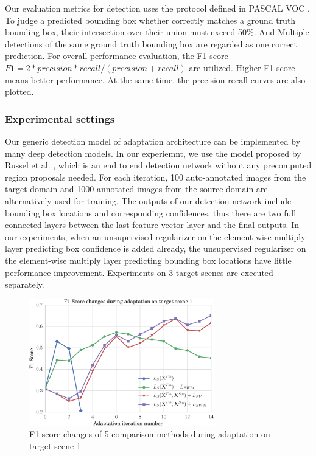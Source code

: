 \documentclass[runningheads]{llncs}
\begin{document}
Our evaluation metrics for detection uses the protocol defined in PASCAL VOC \cite{everingham2015pascal}. To judge a predicted bounding box whether correctly matches a ground truth bounding box, their intersection over their union must exceed 50\%. And Multiple detections of the same ground truth bounding box are regarded as one correct prediction. For overall performance evaluation, the F1 score $F1 = 2*precision*recall/(precision+recall)$ \cite{powers2011evaluation} are utilized. Higher F1 score means better performance. At the same time, the precision-recall curves are also plotted.


\subsubsection{Experimental settings}
Our generic detection model of adaptation architecture can be implemented by many deep detection models. In our experiemnt, we use the model proposed by Russel et al. \cite{stewart2015end}, which is an end to end detection network without any precomputed region proposals needed. For each iteration, 100 auto-annotated images from the target domain and 1000 annotated images from the source domain are alternatively used for training. The outputs of our detection network include bounding box locations and corresponding confidences, thus there are two full connected layers between the last feature vector layer and the final outputs. In our experiments, when an unsupervised regularizer on the element-wise multiply layer predicting box confidence is added already, the unsupervised regularizer on the element-wise multiply layer predicting bounding box locations have little performance improvement. Experiments on 3 target scenes are executed separately.


\begin{figure}
\centering
\includegraphics[height=5.5cm]{images/f1_score.pdf}
\caption{F1 score changes of 5 comparison methods during adaptation on target scene 1}
\label{fig:f1_score}
\end{figure}
\end{document}
